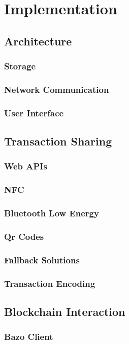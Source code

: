 \documentclass[a4paper]{article}
\begin{document}
\section{Implementation}
\subsection{Architecture}
\subsubsection{Storage}
\subsubsection{Network Communication}
\subsubsection{User Interface}

\subsection{Transaction Sharing}
\subsubsection{Web APIs}
\subsubsection{NFC}
\subsubsection{Bluetooth Low Energy}
\subsubsection{Qr Codes}
\subsubsection{Fallback Solutions}
\subsubsection{Transaction Encoding}

\subsection{Blockchain Interaction}
\subsubsection{Bazo Client}
\end{document}
